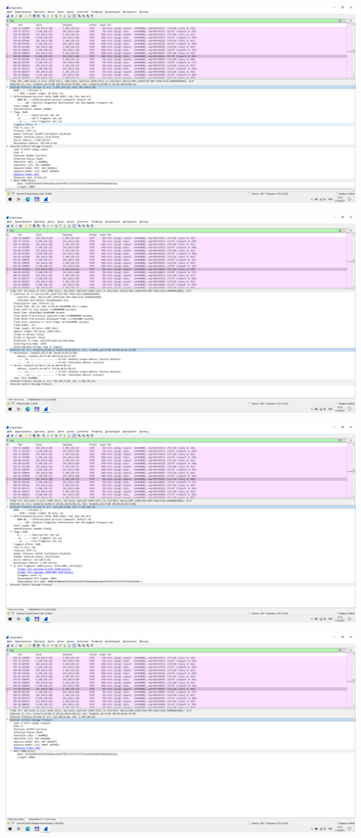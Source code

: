 \includegraphics[width=\textwidth]{screenshots/ping_1000_response_2}

\includegraphics[width=\textwidth]{screenshots/ping_2000_request_1}

\includegraphics[width=\textwidth]{screenshots/ping_2000_request_2}

\includegraphics[width=\textwidth]{screenshots/ping_2000_request_3}

